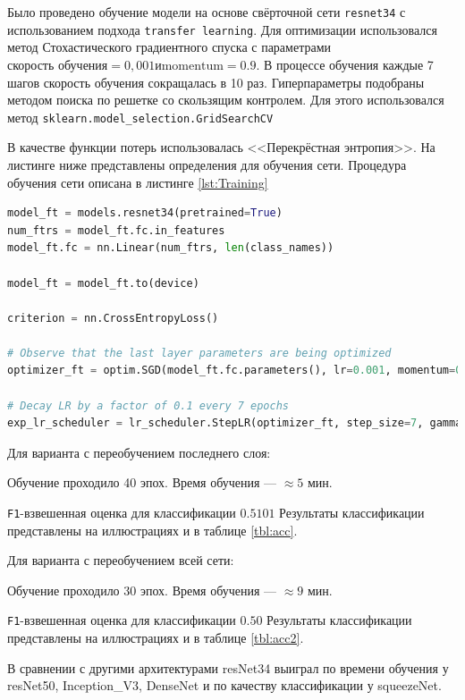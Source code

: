 Было проведено обучение модели на основе свёрточной сети \texttt{resnet34} с использованием подхода \texttt{transfer learning}. Для оптимизации использовался 
метод Стохастического градиентного спуска с параметрами $ \mbox{скорость обучения} = 0,001 и \mbox{momentum} = 0.9$. В процессе обучения каждые 7 шагов скорость обучения 
сокращалась в 10 раз. Гиперпараметры подобраны методом поиска по решетке со скользящим контролем. Для этого использовался метод \texttt{sklearn.model\_selection.GridSearchCV}

В качестве функции потерь использовалась <<Перекрёстная энтропия>>.
На листинге ниже представлены определения для обучения сети.
Процедура обучения сети описана в листинге \ref{lst:Training}
\begin{lstlisting}[language=python,frame=lines]
model_ft = models.resnet34(pretrained=True)
num_ftrs = model_ft.fc.in_features
model_ft.fc = nn.Linear(num_ftrs, len(class_names))

model_ft = model_ft.to(device)

criterion = nn.CrossEntropyLoss()

# Observe that the last layer parameters are being optimized
optimizer_ft = optim.SGD(model_ft.fc.parameters(), lr=0.001, momentum=0.9)

# Decay LR by a factor of 0.1 every 7 epochs
exp_lr_scheduler = lr_scheduler.StepLR(optimizer_ft, step_size=7, gamma=0.1)

\end{lstlisting}

Для варианта с переобучением последнего слоя:
 
Обучение проходило 40 эпох. Время обучения --- $ \approx 5 $ мин.

\texttt{F1}-взвешенная оценка для классификации $ 0.5101 $
Результаты классификации представлены на иллюстрациях и в таблице \ref{tbl:acc}.

Для варианта с переобучением всей сети:

Обучение проходило 30 эпох. Время обучения --- $ \approx9 $ мин.

\texttt{F1}-взвешенная оценка для классификации $ 0.50 $
Результаты классификации представлены на иллюстрациях и в таблице \ref{tbl:acc2}.

В сравнении с другими архитектурами resNet34 выиграл по времени обучения у resNet50, Inception\_V3, DenseNet и по качеству классификации у squeezeNet.

